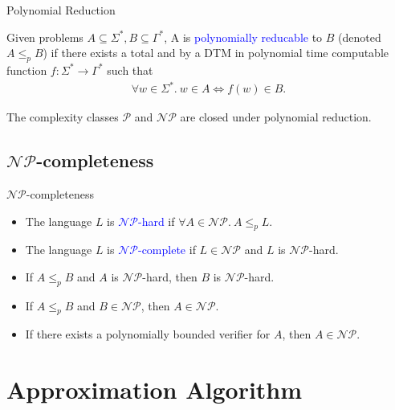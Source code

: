 \documentclass{beamer}
\theoremstyle{definition}
\def\b{\textcolor{blue}}
\begin{document}
\begin{frame}{Polynomial Reduction}
    \begin{definition}
        Given problems $A \subseteq \Sigma^*, B \subseteq \Gamma^*$, A is \b{polynomially reducable} to $B$ (denoted $A \leq_p B$) if there exists a total and by a DTM in polynomial time computable function $f : \Sigma^* \to \Gamma^*$ such that \begin{align*}
            \forall w \in \Sigma^*.\ w \in A \iff f(w) \in B.
        \end{align*}
    \end{definition}\pause
    The complexity classes $\mathcal{P}$ and $\mathcal{NP}$ are closed under polynomial reduction.
\end{frame}

\subsection{$\mathcal{NP}$-completeness}

\begin{frame}{$\mathcal{NP}$-completeness}
    \begin{definition}
        \begin{itemize}
            \item The language $L$ is \b{$\mathcal{NP}$-hard} if $\forall A \in \mathcal{NP}.\ A \leq_p L$.\pause
            \item The language $L$ is \b{$\mathcal{NP}$-complete} if $L \in \mathcal{NP}$ and $L$ is $\mathcal{NP}$-hard.
        \end{itemize}
    \end{definition}\pause
    \begin{example}\pause
        \begin{itemize}
            \item If $A \leq_p B$ and $A$ is $\mathcal{NP}$-hard, then $B$ is $\mathcal{NP}$-hard.\pause
            \item If $A \leq_p B$ and $B \in \mathcal{NP}$, then $A \in \mathcal{NP}$.\pause
            \item If there exists a polynomially bounded verifier for $A$, then $A \in \mathcal{NP}$.
        \end{itemize}
    \end{example}
\end{frame}

\section{Approximation Algorithm}
\end{document}
